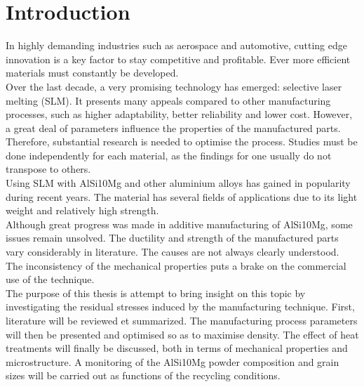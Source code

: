 \chapter{Introduction}
\label{Chap1}

In highly demanding industries such as aerospace and automotive, cutting edge innovation is a key factor to stay competitive and profitable. Ever more efficient materials must constantly be developed.\\

Over the last decade, a very promising technology has emerged: selective laser melting (SLM). It presents many appeals compared to other manufacturing processes, such as higher adaptability, better reliability and lower cost. However, a great deal of parameters influence the properties of the manufactured parts. Therefore, substantial research is needed to optimise the process. Studies must be done independently for each material, as the findings for one usually do not transpose to others.\\

Using SLM with AlSi10Mg and other aluminium alloys has gained in popularity during recent years. The material has several fields of applications due to its light weight and relatively high strength.\\

Although great progress was made in additive manufacturing of AlSi10Mg, some issues remain unsolved. The ductility and strength of the manufactured parts vary considerably in literature. The causes are not always clearly understood. The inconsistency of the mechanical properties puts a brake on the commercial use of the technique.\\

The purpose of this thesis is attempt to bring insight on this topic by investigating the residual stresses induced by the manufacturing technique. First, literature will be reviewed et summarized. The manufacturing process parameters will then be presented and optimised so as to maximise density. The effect of heat treatments will finally be discussed, both in terms of mechanical properties and microstructure. A monitoring of the AlSi10Mg powder composition and grain sizes will be carried out as functions of the recycling conditions.\\